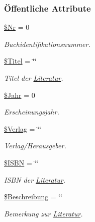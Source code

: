 \subsubsection*{\"{O}ffentliche Attribute}
\begin{CompactItemize}
\item 
\hyperlink{classLiteratur_036a682a93a5d50839c1ebc70a79d4b6}{\$Nr} = 0
\begin{CompactList}\small\item\em Buchidentifikationsnummer. \item\end{CompactList}\item 
\hyperlink{classLiteratur_e30f9e9db9b396e6f87adfdb94e12ba0}{\$Titel} = \char`\"{}\char`\"{}
\begin{CompactList}\small\item\em Titel der \hyperlink{classLiteratur}{Literatur}. \item\end{CompactList}\item 
\hyperlink{classLiteratur_2cb6f40a8757a0edd5da32385ad009c9}{\$Jahr} = 0
\begin{CompactList}\small\item\em Erscheinungsjahr. \item\end{CompactList}\item 
\hyperlink{classLiteratur_5f591208e5d21bb81e6c51484e2a60e0}{\$Verlag} = \char`\"{}\char`\"{}
\begin{CompactList}\small\item\em Verlag/Herausgeber. \item\end{CompactList}\item 
\hyperlink{classLiteratur_9e3b00766297a68adac423980767dd3c}{\$ISBN} = \char`\"{}\char`\"{}
\begin{CompactList}\small\item\em ISBN der \hyperlink{classLiteratur}{Literatur}. \item\end{CompactList}\item 
\hyperlink{classLiteratur_6769ff8b353d2f789125f009b4dcfdc0}{\$Beschreibung} = \char`\"{}\char`\"{}
\begin{CompactList}\small\item\em Bemerkung zur \hyperlink{classLiteratur}{Literatur}. \item\end{CompactList}\item 

\end{CompactItemize}
